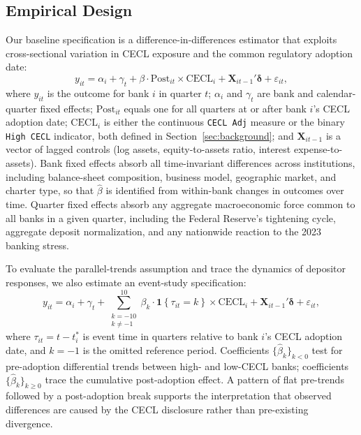 \subsection{Empirical Design}
\label{sec:identification:did}

Our baseline specification is a difference-in-differences estimator that
exploits cross-sectional variation in CECL exposure and the common
regulatory adoption date:
\begin{equation}
  y_{it}
  = \alpha_i + \gamma_t
  + \beta \cdot \mathrm{Post}_{it} \times \mathrm{CECL}_i
  + \mathbf{X}_{it-1}'\boldsymbol{\delta}
  + \varepsilon_{it},
  \label{eq:did}
\end{equation}
where $y_{it}$ is the outcome for bank $i$ in quarter $t$; $\alpha_i$ and
$\gamma_t$ are bank and calendar-quarter fixed effects; $\mathrm{Post}_{it}$
equals one for all quarters at or after bank $i$'s CECL adoption date;
$\mathrm{CECL}_i$ is either the continuous \texttt{CECL Adj} measure or the
binary \texttt{High CECL} indicator, both defined in
Section~\ref{sec:background}; and $\mathbf{X}_{it-1}$ is a vector of lagged
controls (log assets, equity-to-assets ratio, interest expense-to-assets).
Bank fixed effects absorb all time-invariant differences across institutions,
including balance-sheet composition, business model, geographic market, and
charter type, so that $\hat{\beta}$ is identified from within-bank changes
in outcomes over time.  Quarter fixed effects absorb any aggregate
macroeconomic force common to all banks in a given quarter, including the
Federal Reserve's tightening cycle, aggregate deposit normalization, and any
nationwide reaction to the 2023 banking stress.

To evaluate the parallel-trends assumption and trace the dynamics of depositor
responses, we also estimate an event-study specification:
\begin{equation}
  y_{it}
  = \alpha_i + \gamma_t
  + \sum_{\substack{k=-10 \\ k \neq -1}}^{10}
    \beta_k \cdot \mathbf{1}\!\left\{\tau_{it} = k\right\}
    \times \mathrm{CECL}_i
  + \mathbf{X}_{it-1}'\boldsymbol{\delta}
  + \varepsilon_{it},
  \label{eq:eventstudy}
\end{equation}
where $\tau_{it} = t - t_i^{*}$ is event time in quarters relative to bank
$i$'s CECL adoption date, and $k = -1$ is the omitted reference period.
Coefficients $\{\hat{\beta}_k\}_{k < 0}$ test for pre-adoption differential
trends between high- and low-CECL banks; coefficients $\{\hat{\beta}_k\}_{k
\geq 0}$ trace the cumulative post-adoption effect.  A pattern of flat
pre-trends followed by a post-adoption break supports the interpretation that
observed differences are caused by the CECL disclosure rather than
pre-existing divergence.


